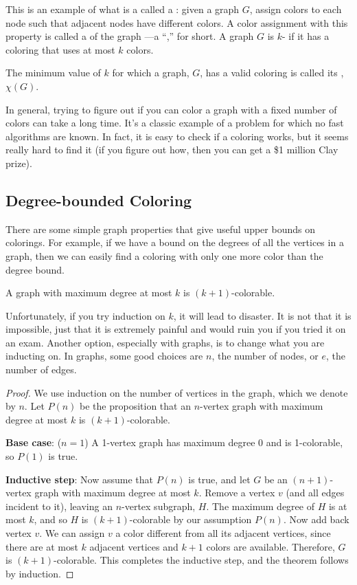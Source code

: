 This is an example of what is a called a :
given a graph $G$, assign colors to each node such that adjacent nodes
have different colors.  A color assignment with this property is called a
 of the graph ---a ``,'' for short.  A
graph $G$ is $k$- if it has a coloring that uses at most
$k$ colors.
\begin{definition}
  The minimum value of $k$ for which a graph, $G$, has a valid coloring is
  called its , $\chi(G)$.
\end{definition}

In general, trying to figure out if you can color a graph with a fixed
number of colors can take a long time.  It's a classic example of a
problem for which no fast algorithms are known.  In fact, it is easy to
check if a coloring works, but it seems really hard to find it (if you
figure out how, then you can get a \$1 million Clay prize).


\subsection{Degree-bounded Coloring}
There are some simple graph properties that give useful upper bounds on
colorings.  For example, if we have a bound on the degrees of all the
vertices in a graph, then we can easily find a coloring with only one more
color than the degree bound.

\begin{theorem}\label{k+1-colorable}
A graph with maximum degree at most $k$ is $(k+1)$-colorable.
\end{theorem}

Unfortunately, if you try induction on $k$, it will lead to disaster.  It
is not that it is impossible, just that it is extremely painful and would
ruin you if you tried it on an exam.  Another option, especially with
graphs, is to change what you are inducting on.  In graphs, some good
choices are $n$, the number of nodes, or $e$, the number of edges.

\begin{proof}
We use induction on the number of vertices in the graph, which we
denote by $n$.  Let $P(n)$ be the proposition that an $n$-vertex graph
with maximum degree at most $k$ is $(k+1)$-colorable.

\textbf{Base case}: ($n=1$) A 1-vertex graph has maximum degree 0 and is
1-colorable, so $P(1)$ is true.

\textbf{Inductive step}: Now assume that $P(n)$ is true, and let $G$ be an
$(n+1)$-vertex graph with maximum degree at most $k$.  Remove a vertex $v$
(and all edges incident to it), leaving an $n$-vertex subgraph, $H$.  The
maximum degree of $H$ is at most $k$, and so $H$ is $(k+1)$-colorable by
our assumption $P(n)$.  Now add back vertex $v$.  We can assign $v$ a
color different from all its adjacent vertices, since there are at
most $k$ adjacent vertices and $k+1$ colors are available.  Therefore, $G$
is $(k+1)$-colorable.  This completes the inductive step, and the theorem
follows by induction.
\end{proof}

